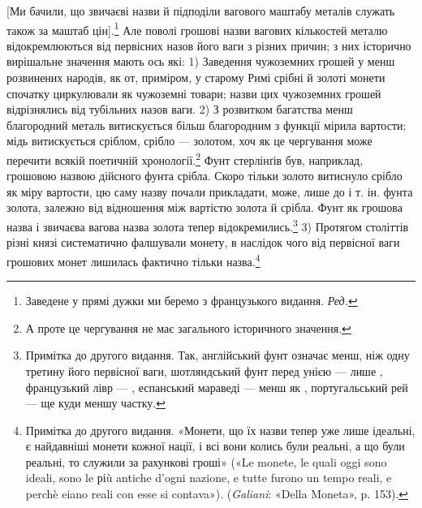 [Ми бачили, що звичаєві назви й підподіли вагового маштабу
металів служать також за маштаб цін].\footnote*{
Заведене у прямі дужки ми беремо з французького видання. \emph{Ред.}
} Але поволі грошові
назви вагових кількостей металю відокремлюються від первісних
назов його ваги з різних причин; з них історично вирішальне
значення мають ось які: 1) Заведення чужоземних грошей у
менш розвинених народів, як от, приміром, у старому Римі
срібні й золоті монети спочатку циркулювали як чужоземні
товари; назви цих чужоземних грошей відрізнялись від тубільних
назов ваги. 2) З розвитком багатства менш благородний
металь витискується більш благородним з функції мірила вартости;
мідь витискується сріблом, срібло — золотом, хоч як це
чергування може перечити всякій поетичній хронології.\footnote{
А проте це чергування не має загального історичного значення.
} Фунт
стерлінґів був, наприклад, грошовою назвою дійсного фунта
срібла. Скоро тільки золото витиснуло срібло як міру вартости,
цю саму назву почали прикладати, може, лише до  і т. ін. фунта
золота, залежно від відношення між вартістю золота й
срібла. Фунт як грошова назва і звичаєва вагова назва золота
тепер відокремились.\footnote{
Примітка до другого видання. Так, англійський фунт означає
менш, ніж одну третину його первісної ваги, шотляндський фунт перед
унією — лише , французький лівр — , еспанський мараведі — менш
як , португальський рей — ще куди меншу частку.
} 3) Протягом століттів різні князі систематично
фалшували монету, в наслідок чого від первісної ваги
грошових монет лишилась фактично тільки назва.\footnote{
Примітка до другого видання. «Монети, що їх назви тепер уже
лише ідеальні, є найдавніші монети кожної нації, і всі вони колись
були реальні, а що були реальні, то служили за рахункові гроші» («Le
monete, le quali oggi sono ideali, sono le ріù antiche d’ogni nazione, e tutte
furono un tempo reali, e perchè eiano reali con esse si contava»). (\emph{Galiani}:
«Della Moneta», p. 153).
}

